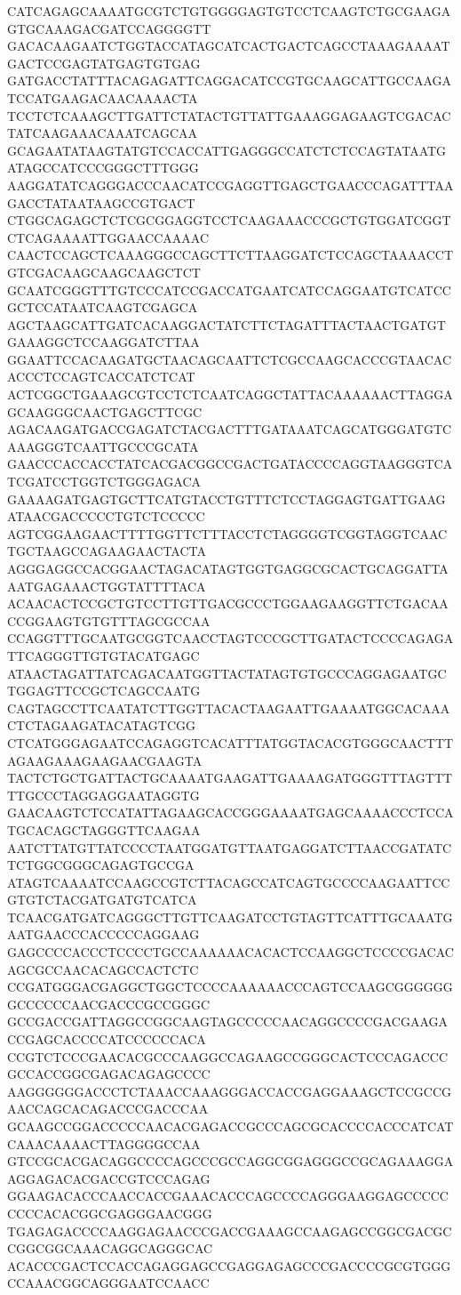 CATCAGAGCAAAATGCGTCTGTGGGGAGTGTCCTCAAGTCTGCGAAGAGTGCAAAGACGATCCAGGGGTT
GACACAAGAATCTGGTACCATAGCATCACTGACTCAGCCTAAAGAAAATGACTCCGAGTATGAGTGTGAG
GATGACCTATTTACAGAGATTCAGGACATCCGTGCAAGCATTGCCAAGATCCATGAAGACAACAAAACTA
TCCTCTCAAAGCTTGATTCTATACTGTTATTGAAAGGAGAAGTCGACACTATCAAGAAACAAATCAGCAA
GCAGAATATAAGTATGTCCACCATTGAGGGCCATCTCTCCAGTATAATGATAGCCATCCCGGGCTTTGGG
AAGGATATCAGGGACCCAACATCCGAGGTTGAGCTGAACCCAGATTTAAGACCTATAATAAGCCGTGACT
CTGGCAGAGCTCTCGCGGAGGTCCTCAAGAAACCCGCTGTGGATCGGTCTCAGAAAATTGGAACCAAAAC
CAACTCCAGCTCAAAGGGCCAGCTTCTTAAGGATCTCCAGCTAAAACCTGTCGACAAGCAAGCAAGCTCT
GCAATCGGGTTTGTCCCATCCGACCATGAATCATCCAGGAATGTCATCCGCTCCATAATCAAGTCGAGCA
AGCTAAGCATTGATCACAAGGACTATCTTCTAGATTTACTAACTGATGTGAAAGGCTCCAAGGATCTTAA
GGAATTCCACAAGATGCTAACAGCAATTCTCGCCAAGCACCCGTAACACACCCTCCAGTCACCATCTCAT
ACTCGGCTGAAAGCGTCCTCTCAATCAGGCTATTACAAAAAACTTAGGAGCAAGGGCAACTGAGCTTCGC
AGACAAGATGACCGAGATCTACGACTTTGATAAATCAGCATGGGATGTCAAAGGGTCAATTGCCCGCATA
GAACCCACCACCTATCACGACGGCCGACTGATACCCCAGGTAAGGGTCATCGATCCTGGTCTGGGAGACA
GAAAAGATGAGTGCTTCATGTACCTGTTTCTCCTAGGAGTGATTGAAGATAACGACCCCCTGTCTCCCCC
AGTCGGAAGAACTTTTGGTTCTTTACCTCTAGGGGTCGGTAGGTCAACTGCTAAGCCAGAAGAACTACTA
AGGGAGGCCACGGAACTAGACATAGTGGTGAGGCGCACTGCAGGATTAAATGAGAAACTGGTATTTTACA
ACAACACTCCGCTGTCCTTGTTGACGCCCTGGAAGAAGGTTCTGACAACCGGAAGTGTGTTTAGCGCCAA
CCAGGTTTGCAATGCGGTCAACCTAGTCCCGCTTGATACTCCCCAGAGATTCAGGGTTGTGTACATGAGC
ATAACTAGATTATCAGACAATGGTTACTATAGTGTGCCCAGGAGAATGCTGGAGTTCCGCTCAGCCAATG
CAGTAGCCTTCAATATCTTGGTTACACTAAGAATTGAAAATGGCACAAACTCTAGAAGATACATAGTCGG
CTCATGGGAGAATCCAGAGGTCACATTTATGGTACACGTGGGCAACTTTAGAAGAAAGAAGAACGAAGTA
TACTCTGCTGATTACTGCAAAATGAAGATTGAAAAGATGGGTTTAGTTTTTGCCCTAGGAGGAATAGGTG
GAACAAGTCTCCATATTAGAAGCACCGGGAAAATGAGCAAAACCCTCCATGCACAGCTAGGGTTCAAGAA
AATCTTATGTTATCCCCTAATGGATGTTAATGAGGATCTTAACCGATATCTCTGGCGGGCAGAGTGCCGA
ATAGTCAAAATCCAAGCCGTCTTACAGCCATCAGTGCCCCAAGAATTCCGTGTCTACGATGATGTCATCA
TCAACGATGATCAGGGCTTGTTCAAGATCCTGTAGTTCATTTGCAAATGAATGAACCCACCCCCAGGAAG
GAGCCCCACCCTCCCCTGCCAAAAAACACACTCCAAGGCTCCCCGACACAGCGCCAACACAGCCACTCTC
CCGATGGGACGAGGCTGGCTCCCCAAAAAACCCAGTCCAAGCGGGGGGGCCCCCCAACGACCCGCCGGGC
GCCGACCGATTAGGCCGGCAAGTAGCCCCCAACAGGCCCCGACGAAGACCGAGCACCCCATCCCCCCACA
CCGTCTCCCGAACACGCCCAAGGCCAGAAGCCGGGCACTCCCAGACCCGCCACCGGCGAGACAGAGCCCC
AAGGGGGGACCCTCTAAACCAAAGGGACCACCGAGGAAAGCTCCGCCGAACCAGCACAGACCCGACCCAA
GCAAGCCGGACCCCCAACACGAGACCGCCCAGCGCACCCCACCCATCATCAAACAAAACTTAGGGGCCAA
GTCCGCACGACAGGCCCCAGCCCGCCAGGCGGAGGGCCGCAGAAAGGAAGGAGACACGACCGTCCCAGAG
GGAAGACACCCAACCACCGAAACACCCAGCCCCAGGGAAGGAGCCCCCCCCCACACGGCGAGGGAACGGG
TGAGAGACCCCAAGGAGAACCCGACCGAAAGCCAAGAGCCGGCGACGCCGGCGGCAAACAGGCAGGGCAC
ACACCCGACTCCACCAGAGGAGCCGAGGAGAGCCCGACCCCGCGTGGGCCAAACGGCAGGGAATCCAACC
